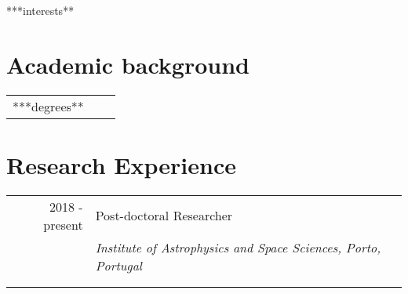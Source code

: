 \documentclass[10pt]{article}
\begin{document}
  ***interests**

\fi

\newcommand{\degree}[7]{\textsc{#1} & #2 in \textsc{#3} & \textbf{#4}\\
                        & \ifthenelse{\equal{#5}{}}{\small ~}{\small Advisors: #5} &
                          \ifthenelse{\equal{#7}{}}{\small ~}{\small #7}\\
                        & \ifthenelse{\equal{#6}{}}{~}{\footnotesize Dissertation: ``#6''} & \\[1ex]
                        }

\newcommand{\experience}[4]{#1 & #2 \\
                            \ifthenelse{\equal{#3}{}}{}{ &\emph{#3}\\ }
                            \ifthenelse{\equal{#4}{}}{}{ &\footnotesize{#4} \\ }
                            }

\section{Academic background}
  \begin{tabularx}{\linewidth}{@{}r X l}

    ***degrees**

  \end{tabularx}

  \vspace{-3em}


\section{Research Experience}
\begin{tabularx}{\linewidth}{@{}r X l}

  \experience{2018 - present}
             {Post-doctoral Researcher}
             {Institute of Astrophysics and Space Sciences, Porto, Portugal}
             {}

\end{tabularx}


\end{document}
